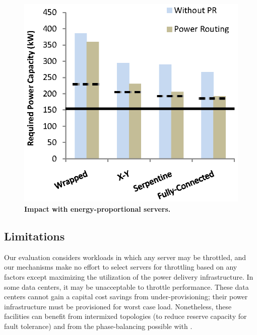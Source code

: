 \begin{figure}[t!]
\centering
\includegraphics[width = 3.0 in]{Appendices/PowerRouting/figure/result_powernap.eps}
\vspace{-.1 in}
\caption{ \textbf{Impact with energy-proportional servers.} }
\label{figure::powernap}
\vspace{-.15 in}
\end{figure}


\subsection{Limitations}

Our evaluation considers workloads in which any server may be throttled, and our mechanisms make no effort to select servers for throttling based on any factors except maximizing the utilization of the power delivery infrastructure.  In some data centers, it may be unacceptable to throttle performance.  These data centers cannot gain a capital cost savings from under-provisioning; their power infrastructure must be provisioned for worst case load.  Nonetheless, these facilities can benefit from intermixed topologies (to reduce reserve capacity for fault tolerance) and from the phase-balancing possible with \PowerRouting.
